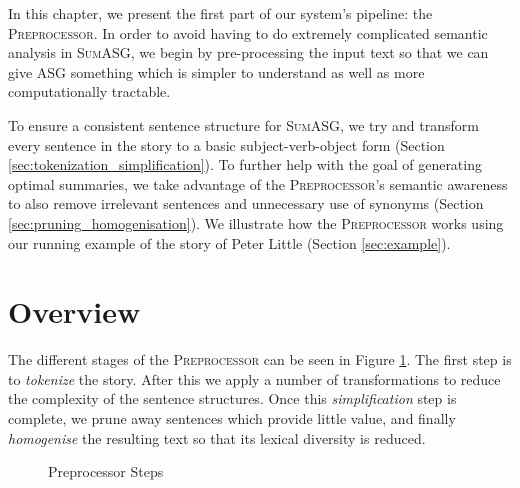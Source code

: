 \label{chapter:preprocessor}

In this chapter, we present the first part of our system's pipeline: the \textsc{Preprocessor}. In order to avoid having to do extremely complicated semantic analysis in \textsc{SumASG}, we begin by pre-processing the input text so that we can give ASG something which is simpler to understand as well as more computationally tractable.

To ensure a consistent sentence structure for \textsc{SumASG}, we try and transform every sentence in the story to a basic subject-verb-object form (Section \ref{sec:tokenization_simplification}). To further help with the goal of generating optimal summaries, we take advantage of the \textsc{Preprocessor}'s semantic awareness to also remove irrelevant sentences and unnecessary use of synonyms (Section \ref{sec:pruning_homogenisation}). We illustrate how the \textsc{Preprocessor} works using our running example of the story of Peter Little (Section \ref{sec:example}).

\section{Overview}

The different stages of the \textsc{Preprocessor} can be seen in Figure \ref{fig:preprocessor_pipeline}. The first step is to \textit{tokenize} the story. After this we apply a number of transformations to reduce the complexity of the sentence structures. Once this \textit{simplification} step is complete, we prune away sentences which provide little value, and finally \textit{homogenise} the resulting text so that its lexical diversity is reduced.

{
\begin{figure}[H]
\centering
{}
\caption{Preprocessor Steps}
\label{fig:preprocessor_pipeline}
\end{figure}
}

